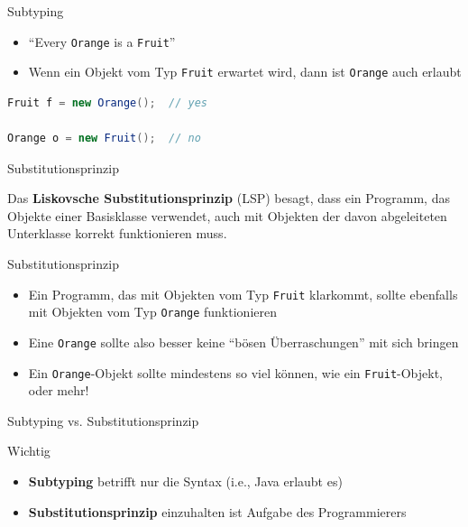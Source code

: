 \documentclass[18pt]{beamer}
\newcommand{\quotes}[1]{``#1''}
\begin{document}
\begin{frame}[fragile]{Subtyping}
    \begin{itemize}
        \item \quotes{Every \texttt{Orange} is a \texttt{Fruit}}
        \item Wenn ein Objekt vom Typ \texttt{Fruit} erwartet wird, dann ist \texttt{Orange} auch erlaubt
    \end{itemize}

    \begin{exampleblock}{}
        \begin{lstlisting}[language=Java]
Fruit f = new Orange();  // yes

Orange o = new Fruit();  // no
        \end{lstlisting}

    \end{exampleblock}
\end{frame}


\begin{frame}{Substitutionsprinzip}
    \begin{block}{}
        Das \textbf{Liskovsche Substitutionsprinzip} (LSP) besagt,
        dass ein Programm, das Objekte einer Basisklasse verwendet,
        auch mit Objekten der davon abgeleiteten Unterklasse korrekt funktionieren muss.
    \end{block}

\end{frame}

\begin{frame}{Substitutionsprinzip}
    \begin{itemize}
        \item Ein Programm, das mit Objekten vom Typ \texttt{Fruit} klarkommt, sollte ebenfalls mit Objekten vom Typ \texttt{Orange} funktionieren
        \item Eine \texttt{Orange} sollte also besser keine \quotes{bösen Überraschungen} mit sich bringen
        \item Ein \texttt{Orange}-Objekt sollte mindestens so viel können, wie ein \texttt{Fruit}-Objekt, oder mehr!
    \end{itemize}
\end{frame}

\begin{frame}{Subtyping vs. Substitutionsprinzip}
    \begin{alertblock}{Wichtig}
        \begin{itemize}
            \item \textbf{Subtyping} betrifft nur die Syntax (i.e., Java erlaubt es)
            \item \textbf{Substitutionsprinzip} einzuhalten ist Aufgabe des Programmierers
        \end{itemize}
    \end{alertblock}

\end{frame}
\end{document}
